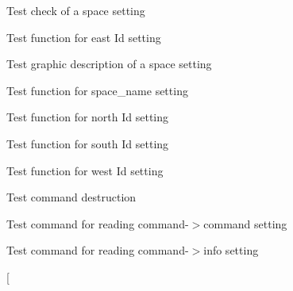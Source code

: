 \begin{DoxyRefList}
\item[\label{test__test000220}%
\hypertarget{test__test000220}{}%
Member \hyperlink{space__test_8h_adedb9f74b100fba85454e4f2b4aca122}{test1\+\_\+space\+\_\+set\+\_\+check} ()]Test check of a space setting  
\item[\label{test__test000213}%
\hypertarget{test__test000213}{}%
Member \hyperlink{space__test_8h_ab1f093af4be3ca8e525d0517cc846f47}{test1\+\_\+space\+\_\+set\+\_\+east} ()]Test function for east Id setting  
\item[\label{test__test000217}%
\hypertarget{test__test000217}{}%
Member \hyperlink{space__test_8h_ad8b51e7da141d7a3b29039a9a1d83013}{test1\+\_\+space\+\_\+set\+\_\+graphic\+\_\+description} ()]Test graphic description of a space setting  
\item[\label{test__test000206}%
\hypertarget{test__test000206}{}%
Member \hyperlink{space__test_8h_a2569bab6cfeec15f722d232bb8c78c9e}{test1\+\_\+space\+\_\+set\+\_\+name} ()]Test function for space\+\_\+name setting  
\item[\label{test__test000209}%
\hypertarget{test__test000209}{}%
Member \hyperlink{space__test_8h_a3d3457a89f705948102cf1e5d4a7b45b}{test1\+\_\+space\+\_\+set\+\_\+north} ()]Test function for north Id setting  
\item[\label{test__test000211}%
\hypertarget{test__test000211}{}%
Member \hyperlink{space__test_8h_a21938e16547b3080e9251f960117a859}{test1\+\_\+space\+\_\+set\+\_\+south} ()]Test function for south Id setting  
\item[\label{test__test000215}%
\hypertarget{test__test000215}{}%
Member \hyperlink{space__test_8h_ab680a8797f793dffd58546074b87d21f}{test1\+\_\+space\+\_\+set\+\_\+west} ()]Test function for west Id setting  
\item[\label{test__test000003}%
\hypertarget{test__test000003}{}%
Member \hyperlink{command__test_8h_ad445f3e81035d4ab32ebc1526eb83fcb}{test2\+\_\+command\+\_\+destroy} ()]Test command destruction  
\item[\label{test__test000008}%
\hypertarget{test__test000008}{}%
Member \hyperlink{command__test_8h_a9c9d95687224d936e9486c0421969411}{test2\+\_\+command\+\_\+get\+\_\+command} ()]Test command for reading command-\/$>$command setting  
\item[\label{test__test000010}%
\hypertarget{test__test000010}{}%
Member \hyperlink{command__test_8h_a057697416fb8f5d97d82f18b5f231930}{test2\+\_\+command\+\_\+get\+\_\+info} ()]Test command for reading command-\/$>$info setting  
\item[\label{test__test000005}%

\end{DoxyRefList}

